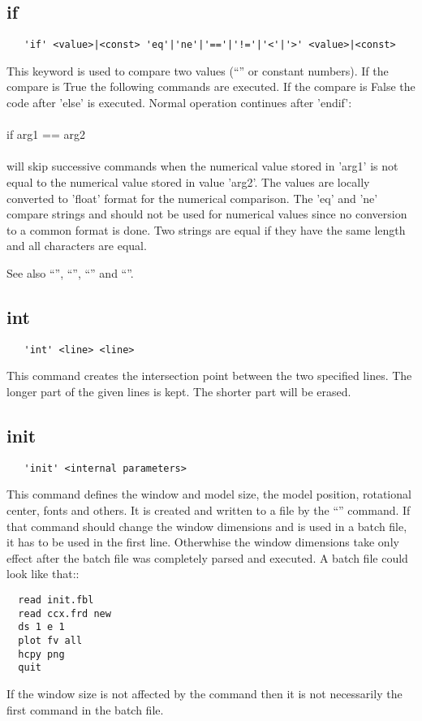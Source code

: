 \documentclass{article}
\begin{document}
\subsection{\label{if}if}
\begin{verbatim}
   'if' <value>|<const> 'eq'|'ne'|'=='|'!='|'<'|'>' <value>|<const>
\end{verbatim}
This keyword is used to compare two values (``'' or constant numbers). If the compare is True the following commands are executed. If the compare is False the code after 'else' is executed. Normal operation continues after 'endif':
\\\\if arg1 == arg2\\\\will skip successive commands when the numerical value stored in 'arg1' is not equal to the numerical value stored in value 'arg2'. The values are locally converted to 'float' format for the numerical comparison. The 'eq' and 'ne' compare strings and should not be used for numerical values since no conversion to a common format is done. Two strings are equal if they have the same length and all characters are equal.

See also ``'', ``'', ``'' and ``''.

\subsection{\label{int}int}
\begin{verbatim}
   'int' <line> <line>
\end{verbatim}
This command creates the intersection point between the two specified lines. The longer part of the given lines is kept. The shorter part will be erased.

\subsection{\label{init}init}
\begin{verbatim}
   'init' <internal parameters>
\end{verbatim}
This command defines the window and model size, the model position, rotational center, fonts and others. It is created and written to a file by the
``'' command. If that command should change the window dimensions and is used in a batch file, it has to be used in the first line. Otherwhise the window dimensions take only effect after the batch file was completely parsed and executed. A batch file could look like that::
\begin{verbatim}
  read init.fbl
  read ccx.frd new
  ds 1 e 1
  plot fv all
  hcpy png
  quit   
\end{verbatim}
If the window size is not affected by the command then it is not necessarily the first command in the batch file.
\end{document}
